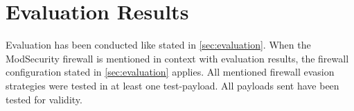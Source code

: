 \section{Evaluation Results}
\label{sec:EvaluationResults}
Evaluation has been conducted like stated in \ref{sec:evaluation}. 
When the ModSecurity firewall is mentioned in context with evaluation results, the firewall configuration stated in \ref{sec:evaluation} applies. 
All mentioned firewall evasion strategies were tested in at least one test-payload.
All payloads sent have been tested for validity.

%
